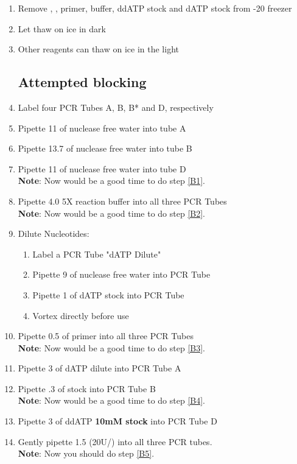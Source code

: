\documentclass{ssiBio}
\begin{document}
\begin{enumerate}
\item{Remove \BdATP{}, \tdt{}, primer, \tdt{}  buffer, ddATP stock and dATP stock from -20\C{} freezer}
\item{Let \BdATP{} thaw on ice in dark}
\item{Other reagents can thaw on ice in the light}
\subsection{Attempted blocking}
\item{Label four PCR Tubes A, B, B* and D, respectively}
\item{Pipette 11\uL{} of nuclease free water into tube A}
\item{Pipette 13.7\uL{} of nuclease free water into tube B}
\item{Pipette 11\uL{} of nuclease free water into tube D}\\
	\textbf{Note}: Now would be a good time to do step \ref{B1}.
\item{Pipette 4.0\uL{} 5X \tdt{} reaction buffer into all three PCR Tubes}\\
	\textbf{Note}: Now would be a good time to do step \ref{B2}.
\item{Dilute Nucleotides:
\begin{enumerate}
\item{Label a PCR Tube "dATP Dilute"}
\item{Pipette 9\uL{} of nuclease free water into PCR Tube}
\item{Pipette 1\uL{} of dATP stock into PCR Tube}
\item{Vortex directly before use}
\end{enumerate}
}
\item{Pipette 0.5\uL{} of primer into all three PCR Tubes}\\
	\textbf{Note}: Now would be a good time to do step \ref{B3}.
\item{Pipette 3\uL{} of dATP dilute into PCR Tube A}
\item{Pipette .3\uL{} of \BdATP{} stock into PCR Tube B}\\
	\textbf{Note}: Now would be a good time to do step \ref{B4}.
\item{Pipette 3\uL{} of ddATP \textbf{10mM stock} into PCR Tube D}
\item{Gently pipette 1.5\uL{} \tdt (20U/\uL{}) into all three PCR tubes.}\\
	\textbf{Note}: Now you should do step \ref{B5}.


\end{enumerate}
\end{document}
